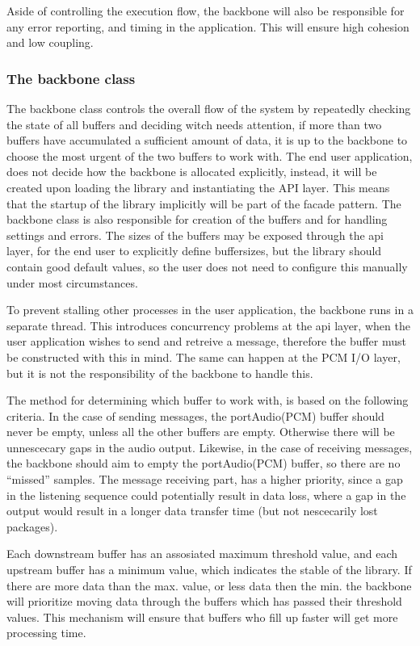 Aside of controlling the execution flow, the backbone will also be responsible for any error reporting, and timing in the application. This will ensure high cohesion and low coupling.

\subsubsection{The backbone class}
The backbone class controls the overall flow of the system by repeatedly checking the state of all buffers and deciding witch needs attention, if more than two buffers have accumulated a sufficient amount of data, it is up to the backbone to choose the most urgent of the two buffers to work with.
The end user application, does not decide how the backbone is allocated explicitly, instead, it will be created upon loading the library and instantiating the API layer. This means that the startup of the library implicitly will be part of the facade pattern.
The backbone class is also responsible for creation of the buffers and for handling settings and errors. The sizes of the buffers may be exposed through the api layer, for the end user to explicitly define buffersizes, but the library should contain good default values, so the user does not need to configure this manually under most circumstances.

To prevent stalling other processes in the user application, the backbone runs in a separate thread. This introduces concurrency problems at the api layer, when the user application wishes to send and retreive a message, therefore the buffer must be constructed with this in mind.
The same can happen at the PCM I/O layer, but it is not the responsibility of the backbone to handle this.

The method for determining which buffer to work with, is based on the following criteria.
In the case of sending messages, the portAudio(PCM) buffer should never be empty, unless all the other buffers are empty. Otherwise there will be unnescecary gaps in the audio output.
Likewise, in the case of receiving messages, the backbone should aim to empty the portAudio(PCM) buffer, so there are no “missed” samples.
The message receiving part, has a higher priority, since a gap in the listening sequence could potentially result in data loss, where a gap in the output would result in a longer data transfer time (but not nescecarily lost packages).

Each downstream buffer has an assosiated maximum threshold value, and each upstream buffer has a minimum value, which indicates the stable of the library. If there are more data than the max. value, or less data then the min. the backbone will prioritize moving data through the buffers which has passed their threshold values. This mechanism will ensure that buffers who fill up faster will get more processing time.

